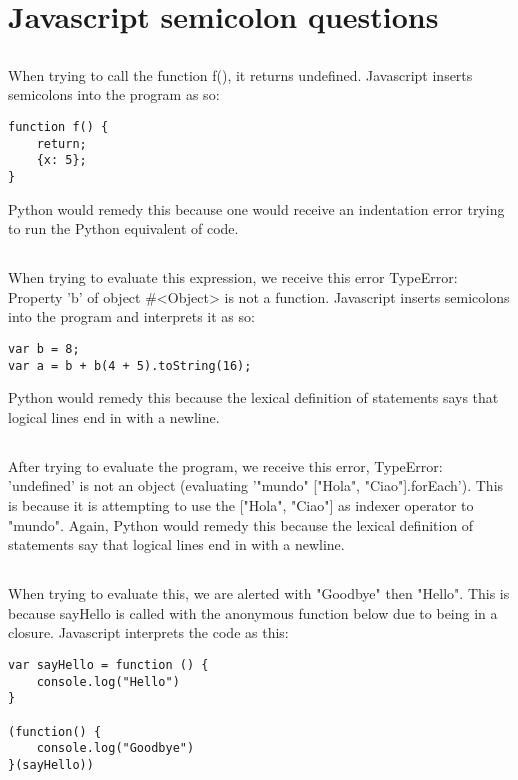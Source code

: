 \documentclass[11pt, oneside]{article}   	%
\begin{document}
\section{Javascript semicolon questions}
\subsection{}
When trying to call the function f(), it returns undefined. Javascript inserts semicolons into the program as so:
\begin{lstlisting}
function f() {
    return;
    {x: 5};
}
\end{lstlisting}
Python would remedy this because one would receive an indentation error trying to run the Python equivalent of code.

\subsection{}
When trying to evaluate this expression, we receive this error TypeError: Property 'b' of object \#<Object> is not a function. Javascript inserts semicolons into the program and interprets it as so: 
\begin{lstlisting}
var b = 8;
var a = b + b(4 + 5).toString(16);
\end{lstlisting}
Python would remedy this because the lexical definition of statements says that logical lines end in with a newline.

\subsection{}
After trying to evaluate the program, we receive this error, TypeError: 'undefined' is not an object (evaluating '"mundo" ["Hola", "Ciao"].forEach'). This is because it is attempting to use the ["Hola", "Ciao"] as indexer operator to "mundo".
Again, Python would remedy this because the lexical definition of statements say that logical lines end in with a newline.

\subsection{}
When trying to evaluate this, we are alerted with "Goodbye" then "Hello". This is because sayHello is called with the anonymous function below due to being in a closure. Javascript interprets the code as this:
\begin{lstlisting}
var sayHello = function () {
    console.log("Hello")
}

(function() {
    console.log("Goodbye")
}(sayHello))
\end{lstlisting}
\end{document}
